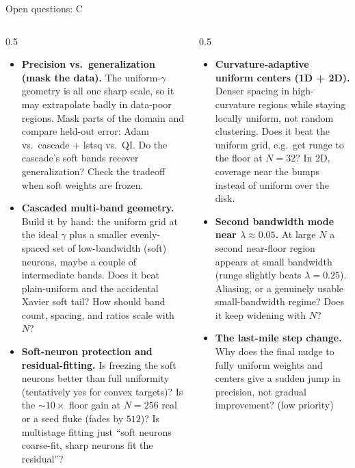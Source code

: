 \documentclass[aspectratio=169,10pt]{beamer}
\begin{document}
\begin{frame}{Open questions: C}
  \begin{columns}[T]
    \begin{column}{0.5\textwidth}
      \begin{itemize}\footnotesize
        \item \textbf{Precision vs.\ generalization (mask the data).} The
              uniform-$\gamma$ geometry is all one sharp scale, so it may
              extrapolate badly in data-poor regions. Mask parts of the domain
              and compare held-out error: Adam vs.\ cascade + lstsq vs.\ QI. Do
              the cascade's soft bands recover generalization? Check the tradeoff
              when soft weights are frozen.
        \item \textbf{Cascaded multi-band geometry.} Build it by hand: the
              uniform grid at the ideal $\gamma$ plus a smaller evenly-spaced set
              of low-bandwidth (soft) neurons, maybe a couple of intermediate
              bands. Does it beat plain-uniform and the accidental Xavier soft
              tail? How should band count, spacing, and ratios scale with $N$?
        \item \textbf{Soft-neuron protection and residual-fitting.} Is freezing
              the soft neurons better than full uniformity (tentatively yes for
              convex targets)? Is the $\sim\!10\times$ floor gain at $N\!=\!256$
              real or a seed fluke (fades by $512$)? Is multistage fitting just
              ``soft neurons coarse-fit, sharp neurons fit the residual''?
      \end{itemize}
    \end{column}
    \begin{column}{0.5\textwidth}
      \begin{itemize}\footnotesize
        \item \textbf{Curvature-adaptive uniform centers (1D + 2D).} Denser
              spacing in high-curvature regions while staying locally uniform,
              not random clustering. Does it beat the uniform grid, e.g.\ get
              runge to the floor at $N\!=\!32$? In 2D, coverage near the bumps
              instead of uniform over the disk.
        \item \textbf{Second bandwidth mode near $\lambda\!\approx\!0.05$.} At
              large $N$ a second near-floor region appears at small bandwidth
              (runge slightly beats $\lambda=0.25$). Aliasing, or a genuinely
              usable small-bandwidth regime? Does it keep widening with $N$?
        \item \textbf{The last-mile step change.} Why does the final nudge to
              fully uniform weights and centers give a sudden jump in precision,
              not gradual improvement? (low priority)
      \end{itemize}
    \end{column}
  \end{columns}
\end{frame}
\end{document}
